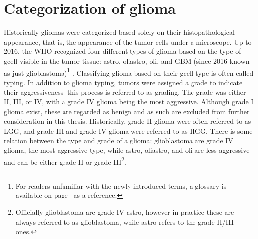\section{Categorization of glioma}
Historically \glspl{glioma} were categorized based solely on their histopathological appearance, that is, the appearance of the \gls{tumor} cells under a microscope.
Up to 2016, the \gls{WHO} recognized four different types of \gls{glioma} based on the type of \gls{gcell} visible in the \gls{tumor} tissue: \gls{astro}, \gls{oliastro}, \gls{oli}, and \gls{GBM} (since 2016 known as just \gls{glioblastoma})\footnote{For readers unfamiliar with the newly introduced terms, a glossary is available on page~\pageref{glossary} as a reference.} \autocite{louis2007who}.
Classifying \gls{glioma} based on their \gls{gcell} type is often called typing.
In addition to \gls{glioma} typing, \glspl{tumor} were assigned a grade to indicate their aggressiveness; this process is referred to as grading.
The grade was either II, III, or IV, with a grade IV \gls{glioma} being the most aggressive.
Although grade I \gls{glioma} exist, these are regarded as benign and as such are excluded from further consideration in this thesis.
Historically, grade II \gls{glioma} were often referred to as \gls{LGG}, and grade III and grade IV \gls{glioma} were referred to as \gls{HGG}.
There is some relation between the type and grade of a glioma; \gls{glioblastoma} are grade IV glioma, the most aggressive type, while \gls{astro}, \gls{oliastro}, and \gls{oli} are less aggressive and can be either grade II or grade III\footnote{Officially \gls{glioblastoma} are grade IV \gls{astro}, however in practice these are always referred to as \gls{glioblastoma}, while \gls{astro} refers to the grade II/III ones.}.

